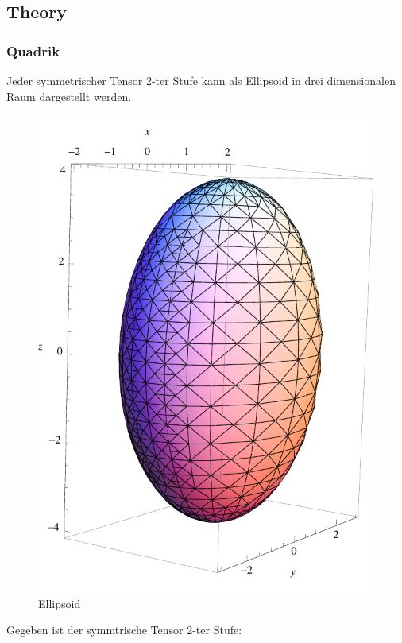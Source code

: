 \documentclass[a4paper]{scrartcl}
\begin{document}
\subsection{Theory}
\subsubsection{Quadrik}
Jeder symmetrischer Tensor 2-ter Stufe kann als Ellipsoid in drei dimensionalen
Raum dargestellt werden.

\begin{figure}[h]
\begin{center}
\includegraphics[scale=0.5]{images/ellipsoid.pdf}
\caption{Ellipsoid}
\label{fig:ellipsoid}
\end{center}
\end{figure}

Gegeben ist der symmtrische Tensor 2-ter Stufe:
\end{document}
